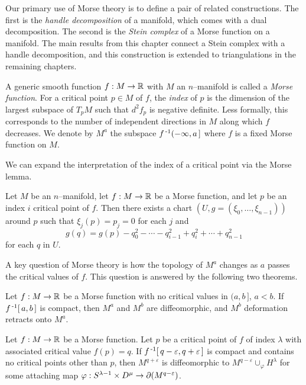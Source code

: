 \label{sec:morsetheory}

Our primary use of Morse theory is to define a pair of related constructions.
The first is the \emph{handle decomposition} of a manifold, which comes with a dual decomposition.
The second is the \emph{Stein complex} of a Morse function on a manifold.
The main results from this chapter connect a Stein complex with a handle decomposition, and this construction is extended to triangulations in the remaining chapters.

\begin{defn}
	A generic smooth function $f:M\to\mathbb{R}$ with $M$ an $n$--manifold is called a \emph{Morse function}.
	For a critical point $p\in M$ of $f$, the \emph{index} of $p$ is the dimension of the largest subspace of $T_p M$ such that $d^2f_p$ is negative definite.
	Less formally, this corresponds to the number of independent directions in $M$ along which $f$ decreases.
	We denote by $M^a$ the subspace $f^{\,\text{-}1}(-\infty,a\,]$ where $f$ is a fixed Morse function on $M$.
\end{defn}

We can expand the interpretation of the index of a critical point via the Morse lemma.

\begin{lem}
  \label{lem:morselemma}
  Let $M$ be an $n$--manifold, let $f:M\to\mathbb{R}$ be a Morse function, and let $p$ be an index $i$ critical point of $f$.
  Then there exists a chart $(U,g=(\xi_0,\dots,\xi_{n-1}))$ around $p$ such that $\xi_j(p)=p_j=0$ for each $j$ and
  \[
    g(q) = g(p) - q_0^2 - \cdots - q_{i-1}^2 + q_i^2 + \cdots + q_{n-1}^2
  \]
  for each $q$ in $U$.
\end{lem}

A key question of Morse theory is how the topology of $M^a$ changes as $a$ passes the critical values of $f$.
This question is answered by the following two theorems.

\begin{theorem}
	\label{thm:morseretract}
	Let $f:M\to\mathbb{R}$ be a Morse function with no critical values in $(a,b\,]$, $a<b$.
	If $f^{\,\text{-}1}[\,a,b\,]$ is compact, then $M^a$ and $M^b$ are diffeomorphic, and $M^b$ deformation retracts onto $M^a$.
\end{theorem}

\begin{theorem}
	\label{thm:morsehandle}
	Let $f:M\to\mathbb{R}$ be a Morse function.
	Let $p$ be a critical point of $f$ of index $\lambda$ with associated critical value $f(p)=q$.
	If $f^{\,\text{-}1}[\,q-\varepsilon, q+\varepsilon\,]$ is compact and contains no critical points other than $p$, then $M^{q+\varepsilon}$ is diffeomorphic to $M^{q-\varepsilon}\cup_\varphi H^\lambda$ for some attaching map $\varphi:S^{\lambda-1}\times D^\mu\to \partial(M^{q-\varepsilon})$.
\end{theorem}

